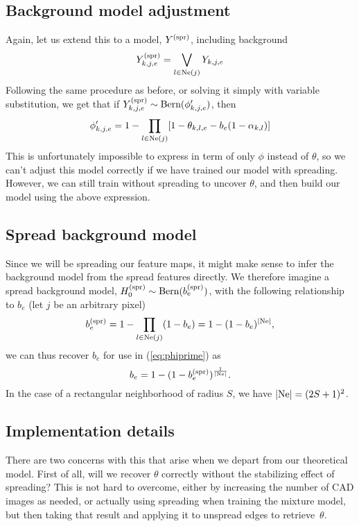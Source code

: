 \documentclass{article}
\newcommand{\Bern}[1]{\text{Bern}(#1)}
\begin{document}
\subsection{Background model adjustment}
Again, let us extend this to a model, $Y^{\text{(spr)}}$, including background
\[
    Y^{\text{(spr)}}_{k,j,e} = \bigvee_{l \in \text{Ne}(j)} Y_{k,j,e}
\]
Following the same procedure as before, or solving it simply with variable substitution, we get that if $\spr{Y}_{k,j,e} \sim \Bern{\phi'_{k,j,e}}$, then
\begin{equation} \label{eq:phiprime}
    \phi'_{k,j,e} = 1 - \prod_{l \in \text{Ne}(j)} [1 - \theta_{k,l,e} - b_e (1 - \alpha_{k,l})]
\end{equation}
This is unfortunately impossible to express in term of only $\phi$ instead of $\theta$, so we can't adjust this model correctly if we have trained our model with spreading. However, we can still train without spreading to uncover $\theta$, and then build our model using the above expression.

\subsection{Spread background model}
Since we will be spreading our feature maps, it might make sense to infer the background model from the spread features directly. We therefore imagine a spread background model, $\spr{H_0} \sim \Bern{\spr{b}_e}$, with the following relationship to $b_e$ (let $j$ be an arbitrary pixel)
\[
    b^{\text{(spr)}}_e = 1 - \prod_{l \in \text{Ne}(j)} (1 - b_e) = 1 - (1 - b_e)^{|\text{Ne}|},
\]
we can thus recover $b_e$ for use in (\ref{eq:phiprime}) as
\[
    b_e = 1 - (1 - b^{\text{(spr)}}_e)^{\frac{1}{|\text{Ne}|}}.
\]
In the case of a rectangular neighborhood of radius $S$, we have $|\text{Ne}| = (2S + 1)^2$.


\subsection{Implementation details}
There are two concerns with this that arise when we depart from our theoretical model. First of all, will we recover $\theta$ correctly without the stabilizing effect of spreading? This is not hard to overcome, either by increasing the number of CAD images as needed, or actually using spreading when training the mixture model, but then taking that result and applying it to unspread edges to retrieve~$\theta$. 
\end{document}
